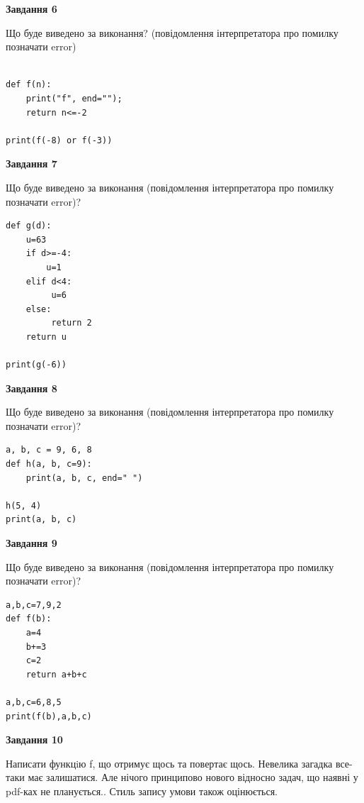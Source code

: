 \documentclass[12pt, ukrainian]{article}
\begin{document}
{\begin {large}
{\begin {center}\textbf{Завдання 6}\end {center}}

Що буде виведено за виконання? (повідомлення інтерпретатора про помилку позначати error)\par
\begin{verbatim}

def f(n):
    print("f", end="");
    return n<=-2

print(f(-8) or f(-3))
\end{verbatim}

{\begin {center}\textbf{Завдання 7}\end {center}}

Що буде виведено за виконання (повідомлення інтерпретатора про помилку позначати error)?\par
\begin{verbatim}
def g(d):
    u=63
    if d>=-4: 
        u=1
    elif d<4:
         u=6
    else:
         return 2
    return u

print(g(-6))
\end{verbatim}

{\begin {center}\textbf{Завдання 8}\end {center}}

Що буде виведено за виконання (повідомлення інтерпретатора про помилку позначати error)?\par
\begin{verbatim}
a, b, c = 9, 6, 8
def h(a, b, c=9):
    print(a, b, c, end=" ")

h(5, 4)
print(a, b, c)
\end{verbatim}

{\begin {center}\textbf{Завдання 9}\end {center}}

Що буде виведено за виконання (повідомлення інтерпретатора про помилку позначати error)?\par
\begin{verbatim}
a,b,c=7,9,2
def f(b):
    a=4
    b+=3
    c=2
    return a+b+c

a,b,c=6,8,5
print(f(b),a,b,c)
\end{verbatim}

{\begin {center}\textbf{Завдання 10}\end {center}}


Написати функцiю f, що отримує щось та повертає щось. Невелика загадка все-таки має залишатися. Але нічого принципово нового відносно задач, що наявні у pdf-ках не планується.. Стиль запису умови також оцінюється.\par
\end {large}}
\newpage
\end{document}
